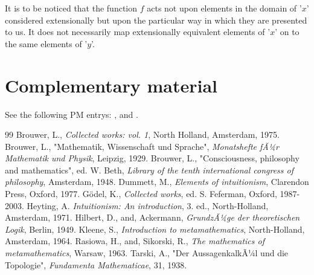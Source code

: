 \documentclass[12pt]{article}
\begin{document}
It is to be noticed that the function $f$ acts not upon elements in the domain of '$x$' considered extensionally but upon the particular way in which they are presented to us. It does not necessarily map extensionally equivalent elements of '$x$' on to the same elements of '$y$'. 

\section{Complementary material}

See the following PM entrys: , and . 

\begin{thebibliography} {99}
 Brouwer, L., \emph{Collected works: vol. 1}, North Holland, Amsterdam, 1975.
 Brouwer, L., "Mathematik, Wissenschaft und Sprache", \emph{Monatshefte fÃ¼r Mathematik und Physik}, Leipzig, 1929.
 Brouwer, L., "Consciousness, philosophy and mathematics", ed. W. Beth, \emph{Library of the tenth international congress of philosophy}, Amsterdam, 1948.
 Dummett, M., \emph{Elements of intuitionism}, Clarendon Press, Oxford, 1977.
 G\"{o}del, K., \emph{Collected works}, ed. S. Feferman, Oxford, 1987-2003.
 Heyting, A. \emph{Intuitionism: An introduction}, 3. ed., North-Holland, Amsterdam, 1971.
 Hilbert, D., and, Ackermann, \emph{GrundzÃ¼ge der theoretischen Logik}, Berlin, 1949.
 Kleene, S., \emph{Introduction to metamathematics}, North-Holland, Amsterdam, 1964.
 Rasiowa, H., and, Sikorski, R., \emph{The mathematics of metamathematics}, Warsaw, 1963.
 Tarski, A., "Der AussagenkalkÃ¼l und die Topologie", \emph{Fundamenta Mathematicae}, 31, 1938.
\end{thebibliography}
\end{document}
